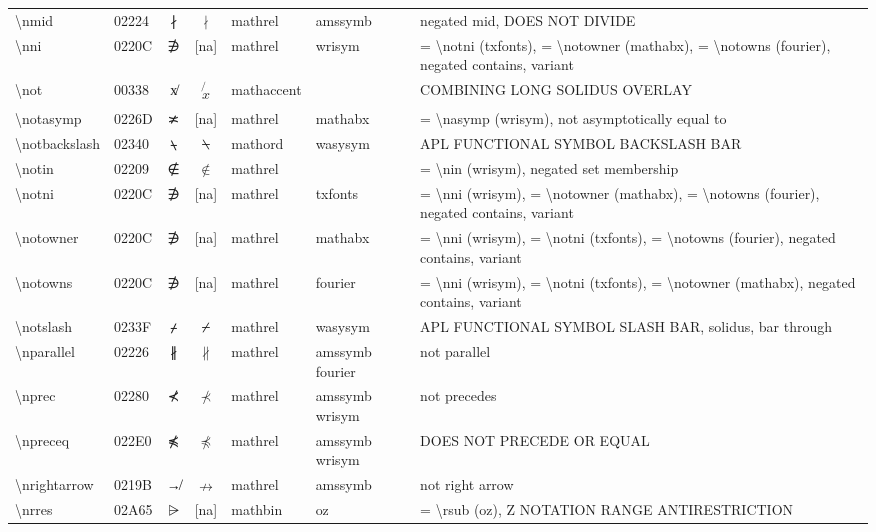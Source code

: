 \documentclass[a4paper,landscape]{article}
\begin{document}
\begin{longtable}{llcclll}
\textbackslash{}nmid & 02224 & ∤ & $\nmid$ & mathrel & amssymb & negated mid, DOES NOT DIVIDE \\
\textbackslash{}nni & 0220C & ∌ & [na] & mathrel & wrisym & = \textbackslash{}notni (txfonts), = \textbackslash{}notowner (mathabx), = \textbackslash{}notowns (fourier), negated contains, variant \\
\textbackslash{}not & 00338 & x̸ & $\not{x}$ & mathaccent &  & COMBINING LONG SOLIDUS OVERLAY \\
\textbackslash{}notasymp & 0226D & ≭ & [na] & mathrel & mathabx & = \textbackslash{}nasymp (wrisym), not asymptotically equal to \\
\textbackslash{}notbackslash & 02340 & \texttt ⍀ & $\notbackslash$ & mathord & wasysym & APL FUNCTIONAL SYMBOL BACKSLASH BAR \\
\textbackslash{}notin & 02209 & ∉ & $\notin$ & mathrel &  & = \textbackslash{}nin (wrisym), negated set membership \\
\textbackslash{}notni & 0220C & ∌ & [na] & mathrel & txfonts & = \textbackslash{}nni (wrisym),  = \textbackslash{}notowner (mathabx),  = \textbackslash{}notowns (fourier),  negated contains,  variant \\
\textbackslash{}notowner & 0220C & ∌ & [na] & mathrel & mathabx & = \textbackslash{}nni (wrisym), = \textbackslash{}notni (txfonts),  = \textbackslash{}notowns (fourier),  negated contains,  variant \\
\textbackslash{}notowns & 0220C & ∌ & [na] & mathrel & fourier & = \textbackslash{}nni (wrisym), = \textbackslash{}notni (txfonts),  = \textbackslash{}notowner (mathabx),  negated contains,  variant \\
\textbackslash{}notslash & 0233F & \texttt ⌿ & $\notslash$ & mathrel & wasysym & APL FUNCTIONAL SYMBOL SLASH BAR, solidus, bar through \\
\textbackslash{}nparallel & 02226 & ∦ & $\nparallel$ & mathrel & amssymb fourier & not parallel \\
\textbackslash{}nprec & 02280 & ⊀ & $\nprec$ & mathrel & amssymb wrisym & not precedes \\
\textbackslash{}npreceq & 022E0 & ⋠ & $\npreceq$ & mathrel & amssymb wrisym & DOES NOT PRECEDE OR EQUAL \\
\textbackslash{}nrightarrow & 0219B & ↛ & $\nrightarrow$ & mathrel & amssymb & not right arrow \\
\textbackslash{}nrres & 02A65 & ⩥ & [na] & mathbin & oz & = \textbackslash{}rsub (oz),  Z NOTATION RANGE ANTIRESTRICTION \\

\end{longtable}
\end{document}
